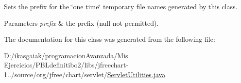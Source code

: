 Sets the prefix for the \char`\"{}one time\char`\"{} temporary file names generated by this class.


\begin{DoxyParams}{Parameters}
{\em prefix} & the prefix ({\ttfamily null} not permitted). \\
\hline
\end{DoxyParams}


The documentation for this class was generated from the following file\+:\begin{DoxyCompactItemize}
\item 
D\+:/ikasgaiak/programacion\+Avanzada/\+Mis Ejercicios/\+P\+B\+Ldefinitibo2/libs/jfreechart-\/1../source/org/jfree/chart/servlet/\mbox{\hyperlink{_servlet_utilities_8java}{Servlet\+Utilities.\+java}}\end{DoxyCompactItemize}
